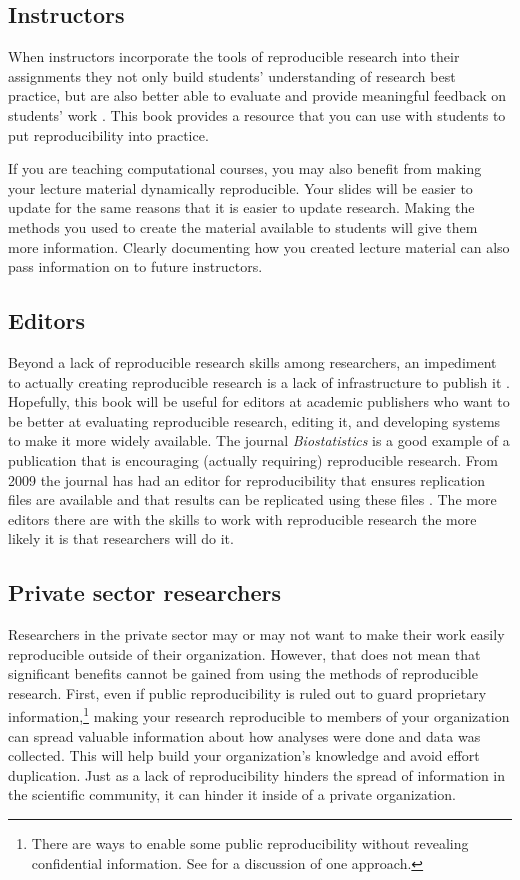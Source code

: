 \documentclass[krantz1]{krantz}
\begin{document}
\subsection{Instructors}
When instructors incorporate the tools of reproducible research into their assignments they not only build students' understanding of research best practice, but are also better able to evaluate and provide meaningful feedback on students' work \cite[183]{Ball2012}. This book provides a resource that you can use with students to put reproducibility into practice.

If you are teaching computational courses, you may also benefit from making your lecture material dynamically reproducible. Your slides will be easier to update for the same reasons that it is easier to update research.  Making the methods you used to create the material available to students will give them more information. Clearly documenting how you created lecture material can also pass information on to future instructors. 

\subsection{Editors}
Beyond a lack of reproducible research skills among researchers, an impediment to actually creating reproducible research is a lack of infrastructure to publish it \cite[]{Peng2011}. Hopefully, this book will be useful for editors at academic publishers who want to be better at evaluating reproducible research, editing it, and developing systems to make it more widely available. The journal {\emph{Biostatistics}} is a good example of a publication that is encouraging (actually requiring) reproducible research. From 2009 the journal  has had an editor for reproducibility that ensures replication files are available and that results can be replicated using these files \cite[]{Peng2009}. The more editors there are with the skills to work with reproducible research the more likely it is that researchers will do it.

\subsection{Private sector researchers}

Researchers in the private sector may or may not want to make their work easily reproducible outside of their organization. However, that does not mean that significant benefits cannot be gained from using the methods of reproducible research. First, even if public reproducibility is ruled out to guard proprietary information,\footnote{There are ways to enable some public reproducibility without revealing confidential information. See \cite{Vandewalle2007} for a discussion of one approach.} making your research reproducible to members of your organization can spread valuable information about how analyses were done and data was collected. This will help build your organization's knowledge and avoid effort duplication. Just as a lack of reproducibility hinders the spread of information in the scientific community, it can hinder it inside of a private organization. 
\end{document}
